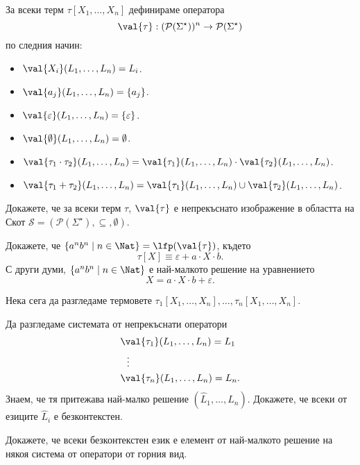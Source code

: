 За всеки терм $\tau[X_1,\dots,X_n]$ дефинираме оператора 
\[\val{\tau}: (\mathcal{P}(\Sigma^\star))^n \to \mathcal{P}(\Sigma^\star)\]
по следния начин:
\begin{itemize}
\item 
  $\val{X_i}(L_1,\dots,L_n) = L_i$.
\item 
  $\val{a_j}(L_1,\dots,L_n) = \{a_j\}$.
\item 
  $\val{\varepsilon}(L_1,\dots,L_n) = \{\varepsilon\}$.
\item 
  $\val{\emptyset}(L_1,\dots,L_n) = \emptyset$.
\item 
  $\val{\tau_1 \cdot \tau_2}(L_1,\dots,L_n) = \val{\tau_1}(L_1,\dots,L_n) \cdot \val{\tau_2}(L_1,\dots,L_n)$.
\item
  $\val{\tau_1 + \tau_2}(L_1,\dots,L_n) = \val{\tau_1}(L_1,\dots,L_n) \cup \val{\tau_2}(L_1,\dots,L_n)$.
\end{itemize}

\begin{problem}
  Докажете, че за всеки терм $\tau$, $\val{\tau}$ е непрекъснато изображение в областта на Скот
  $\mathcal{S} = ( \mathcal{P}(\Sigma^\star),\subseteq, \emptyset)$.
\end{problem}

\begin{problem}
  Докажете, че $\{a^nb^n \mid n\in \Nat\} = \lfp(\val{\tau})$, където 
  \[\tau[X] \equiv \varepsilon + a \cdot X \cdot b.\]
  С други думи, $\{a^nb^n \mid n \in \Nat\}$ е най-малкото решение на уравнението
  \[X = a \cdot X \cdot b + \varepsilon.\]
\end{problem}

Нека сега да разгледаме термовете $\tau_1[X_1,\dots,X_n], \dots, \tau_n[X_1,\dots,X_n]$.

\begin{problem}
  Да разгледаме системата от непрекъснати оператори
  \begin{align*}
    & \val{\tau_1}(L_1,\dots,L_n) = L_1\\
    & \ \ \vdots\\
    & \val{\tau_n}(L_1,\dots,L_n) = L_n.
  \end{align*}
  Знаем, че тя притежава най-малко решение $(\hat{L}_1,\dots,\hat{L}_n)$.
  Докажете, че всеки от езиците $\hat{L}_i$ е безконтекстен.

  Докажете, че всеки безконтекстен език е елемент от най-малкото решение 
  на някоя система от оператори от горния вид.
\end{problem}

